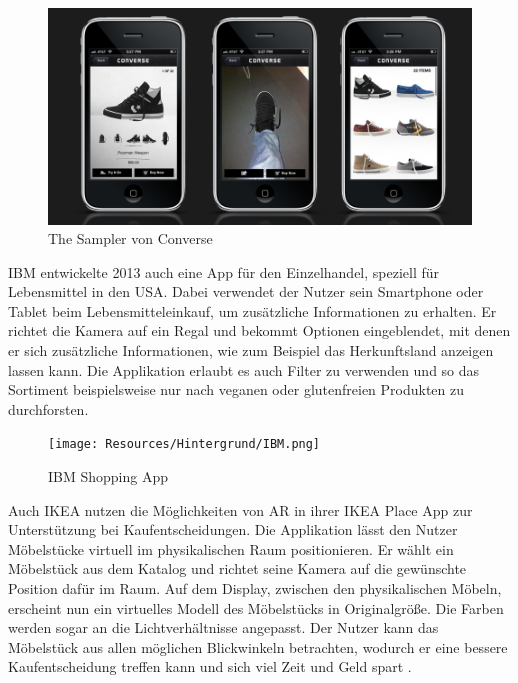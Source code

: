\begin{figure}[h]
	\begin{center}
		\noindent\includegraphics[scale=0.45]{Resources/Hintergrund/sampler.jpg}
		\caption[The Sampler von Converse]{The Sampler von Converse\footnotemark}	
	\end{center}
\end{figure}


IBM entwickelte 2013 auch eine App für den Einzelhandel, speziell für Lebensmittel in den USA. Dabei verwendet der Nutzer sein Smartphone oder Tablet beim Lebensmitteleinkauf, um zusätzliche Informationen zu erhalten. Er richtet die Kamera auf ein Regal und bekommt Optionen eingeblendet, mit denen er sich zusätzliche Informationen, wie zum Beispiel das Herkunftsland anzeigen lassen kann. Die Applikation erlaubt es auch Filter zu verwenden und so das Sortiment beispielsweise nur nach veganen oder glutenfreien Produkten zu durchforsten.

\begin{figure}[h]
	\begin{center}
		\noindent\texttt{[image: Resources/Hintergrund/IBM.png]}
		\caption[IBM Shopping App]{IBM Shopping App\footnotemark}	
	\end{center}
\end{figure}


Auch IKEA nutzen die Möglichkeiten von AR in ihrer IKEA Place App zur Unterstützung bei Kaufentscheidungen. Die Applikation lässt den Nutzer Möbelstücke virtuell im physikalischen Raum positionieren. Er wählt ein Möbelstück aus dem Katalog und richtet seine Kamera auf die gewünschte Position dafür im Raum. Auf dem Display, zwischen den physikalischen Möbeln, erscheint nun ein virtuelles Modell des Möbelstücks in Originalgröße. Die Farben werden sogar an die Lichtverhältnisse angepasst. Der Nutzer kann das Möbelstück aus allen möglichen Blickwinkeln betrachten, wodurch er eine bessere Kaufentscheidung treffen kann und sich viel Zeit und Geld spart \cite{helander_joel_2017}.

